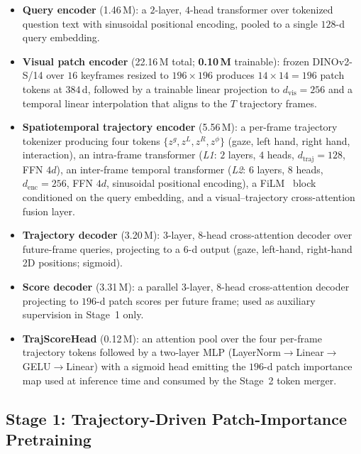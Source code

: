 \begin{itemize}\itemsep1pt
\item \textbf{Query encoder} (1.46\,M): a $2$-layer, $4$-head transformer
      over tokenized question text with sinusoidal positional encoding,
      pooled to a single $128$-d query embedding.
\item \textbf{Visual patch encoder} (22.16\,M total; \textbf{0.10\,M}
      trainable): frozen DINOv2-S/14 over $16$ keyframes resized to
      $196{\times}196$ produces $14{\times}14{=}196$ patch tokens at $384$\,d,
      followed by a trainable linear projection to $d_\text{vis}{=}256$ and
      a temporal linear interpolation that aligns to the $T$ trajectory
      frames.
\item \textbf{Spatiotemporal trajectory encoder} (5.56\,M):
      a per-frame trajectory tokenizer producing four tokens
      $\{z^g, z^L, z^R, z^\phi\}$ (gaze, left hand, right hand, interaction),
      an intra-frame transformer (\emph{L1}: $2$ layers, $4$ heads,
      $d_\text{traj}{=}128$, FFN $4d$), an inter-frame temporal transformer
      (\emph{L2}: $6$ layers, $8$ heads, $d_\text{enc}{=}256$, FFN $4d$,
      sinusoidal positional encoding), a FiLM~\citep{perez2018film}
      block conditioned on the query embedding, and a
      visual--trajectory cross-attention fusion layer.
\item \textbf{Trajectory decoder} (3.20\,M): $3$-layer, $8$-head
      cross-attention decoder over future-frame queries, projecting to a
      $6$-d output (gaze, left-hand, right-hand 2D positions; sigmoid).
\item \textbf{Score decoder} (3.31\,M): a parallel $3$-layer, $8$-head
      cross-attention decoder projecting to $196$-d patch scores per
      future frame; used as auxiliary supervision in Stage~1 only.
\item \textbf{TrajScoreHead} (0.12\,M): an attention pool over the four
      per-frame trajectory tokens followed by a two-layer MLP
      (LayerNorm$\to$Linear$\to$GELU$\to$Linear) with a sigmoid head
      emitting the $196$-d patch importance map used at inference time
      and consumed by the Stage~2 token merger.
\end{itemize}

\subsection{Stage 1: Trajectory-Driven Patch-Importance Pretraining}
\label{sec:impl-stage1}

